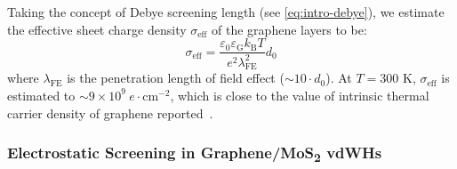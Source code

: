 %
Taking the concept of Debye screening length (see
\autoref{eq:intro-debye}), we estimate the
effective sheet charge density $\sigma_{\mathrm{eff}}$ of the graphene layers to be:
\begin{equation}
\label{eq:asym-debye}
\sigma_{\mathrm{eff}} = \dfrac{\varepsilon_{0} \varepsilon_{\mathrm{G}} k_{\mathrm{B}} T}{e^{2} \lambda_{\mathrm{FE}}^{2}} d_{0}
\end{equation}
where $\lambda_{\mathrm{FE}}$ is the penetration length of field
effect ($\sim{}10\cdot{}d_{0}$). At $T=300$ K, $\sigma_{\mathrm{eff}}$
is estimated to $\sim{}9\times10^{9}\ e\cdot$cm$^{-2}$, which is
close to the value of intrinsic thermal carrier density of graphene
reported~\autocite{Fang_2007_carrier_graphene}.


\subsubsection{Electrostatic Screening in Graphene/MoS\textsubscript{2} vdWHs}
\label{sec:asym-classic}

